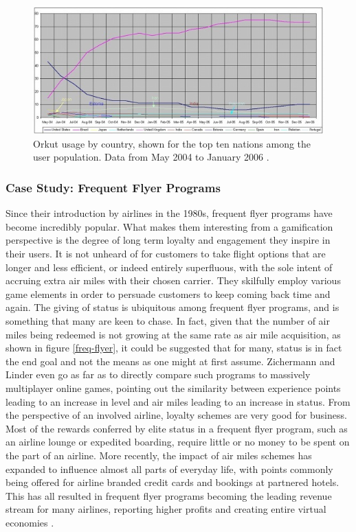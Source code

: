 \documentclass[12pt]{article}
\begin{document}
\begin{figure}[p]
	\includegraphics{../img/orkut-brazil.jpg}
	\caption{Orkut usage by country, shown for the top ten nations among the user population. Data from May 2004 to January 2006 \cite{fragoso2006wtf}.}
	\label{orkut-brazil}
\end{figure}

\subsubsection{Case Study: Frequent Flyer Programs}
Since their introduction by airlines in the 1980s, frequent flyer programs have become incredibly popular. What makes them interesting from a gamification perspective is the degree of long term loyalty and engagement they inspire in their users. It is not unheard of for customers to take flight options that are longer and less efficient, or indeed entirely superfluous, with the sole intent of accruing extra air miles with their chosen carrier. They skilfully employ various game elements in order to persuade customers to keep coming back time and again. The giving of status is ubiquitous among frequent flyer programs, and is something that many are keen to chase. In fact, given that the number of air miles being redeemed is not growing at the same rate as air mile acquisition, as shown in figure \ref{freq-flyer}, it could be suggested that for many, status is in fact the end goal and not the means as one might at first assume. Zichermann and Linder even go as far as to directly compare such programs to massively multiplayer online games, pointing out the similarity between experience points leading to an increase in level and air miles leading to an increase in status. From the perspective of an involved airline, loyalty schemes are very good for business. Most of the rewards conferred by elite status in a frequent flyer program, such as an airline lounge or expedited boarding, require little or no money to be spent on the part of an airline. More recently, the impact of air miles schemes has expanded to influence almost all parts of everyday life, with points commonly being offered for airline branded credit cards and bookings at partnered hotels. This has all resulted in frequent flyer programs becoming the leading revenue stream for many airlines, reporting higher profits and creating entire virtual economies \cite{zichermann2010game}.
\end{document}
